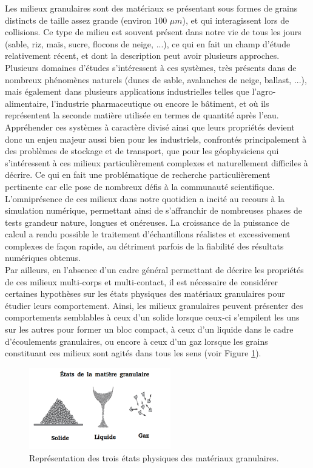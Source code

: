 Les milieux granulaires sont des matériaux se présentant sous formes de grains distincts de taille assez grande (environ $100$ $\mu m$), et qui interagissent lors de collisions. Ce type de milieu est souvent présent dans notre vie de tous les jours (sable, riz, maïs, sucre, flocons de neige, ...), ce qui en fait un champ d'étude relativement récent, et dont la description peut avoir plusieurs approches. Plusieurs domaines d'études s'intéressent à ces systèmes, très présents dans de nombreux phénomènes naturels (dunes de sable, avalanches de neige, ballast, ...), mais également dans plusieurs applications industrielles telles que l'agro-alimentaire, l'industrie pharmaceutique ou encore le bâtiment, et où ils représentent la seconde matière utilisée en termes de quantité après l'eau. Appréhender ces systèmes à caractère divisé ainsi que leurs propriétés devient donc un enjeu majeur aussi bien pour les industriels, confrontés principalement à des problèmes de stockage et de transport, que pour les géophysiciens qui s'intéressent à ces milieux particulièrement complexes et naturellement difficiles à décrire. Ce qui en fait une problématique de recherche particulièrement pertinente car elle pose de nombreux défis à la communauté scientifique. L'omniprésence de ces milieux dans notre quotidien a incité au recours à la simulation numérique, permettant ainsi de s'affranchir de nombreuses phases de tests grandeur nature, longues et onéreuses. La croissance de la puissance de calcul a rendu possible le traitement d'échantillons réalistes et excessivement complexes de façon rapide, au détriment parfois de la fiabilité des résultats numériques obtenus.\\
Par ailleurs, en l'absence d'un cadre général permettant de décrire les propriétés de ces milieux multi-corps et multi-contact, il est nécessaire de considérer certaines hypothèses sur les états physiques des matériaux granulaires pour étudier leurs comportement. Ainsi, les milieux granulaires peuvent présenter des comportements semblables à ceux d'un solide lorsque ceux-ci s'empilent les uns sur les autres pour former un bloc compact, à ceux d'un liquide dans le cadre d'écoulements granulaires, ou encore à ceux d'un gaz lorsque les grains constituant ces milieux sont agités dans tous les sens (voir Figure \ref{solide_liq_gaz}).

\begin{figure}[!h]
        \centering
        \includegraphics[width=0.55\textwidth]{chapitres/chapitre_0_Introduction/figures/solide_liquide_gaz.png}
        \caption{Représentation des trois états physiques des matériaux granulaires.}
        \label{solide_liq_gaz}    
    \end{figure}

